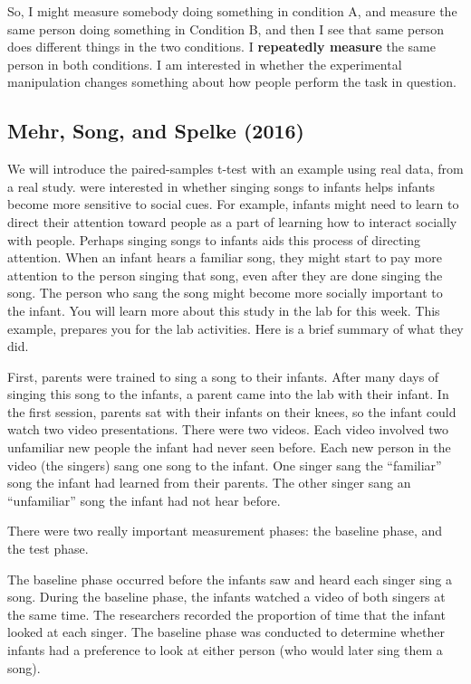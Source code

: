 \documentclass[]{book}
\begin{document}
So, I might measure somebody doing something in condition A, and measure the same person doing something in Condition B, and then I see that same person does different things in the two conditions. I \textbf{repeatedly measure} the same person in both conditions. I am interested in whether the experimental manipulation changes something about how people perform the task in question.

\hypertarget{mehr-song-and-spelke-2016}{%
\subsection{Mehr, Song, and Spelke (2016)}\label{mehr-song-and-spelke-2016}}

We will introduce the paired-samples t-test with an example using real data, from a real study. \citet{mehr20165} were interested in whether singing songs to infants helps infants become more sensitive to social cues. For example, infants might need to learn to direct their attention toward people as a part of learning how to interact socially with people. Perhaps singing songs to infants aids this process of directing attention. When an infant hears a familiar song, they might start to pay more attention to the person singing that song, even after they are done singing the song. The person who sang the song might become more socially important to the infant. You will learn more about this study in the lab for this week. This example, prepares you for the lab activities. Here is a brief summary of what they did.

First, parents were trained to sing a song to their infants. After many days of singing this song to the infants, a parent came into the lab with their infant. In the first session, parents sat with their infants on their knees, so the infant could watch two video presentations. There were two videos. Each video involved two unfamiliar new people the infant had never seen before. Each new person in the video (the singers) sang one song to the infant. One singer sang the ``familiar'' song the infant had learned from their parents. The other singer sang an ``unfamiliar'' song the infant had not hear before.

There were two really important measurement phases: the baseline phase, and the test phase.

The baseline phase occurred before the infants saw and heard each singer sing a song. During the baseline phase, the infants watched a video of both singers at the same time. The researchers recorded the proportion of time that the infant looked at each singer. The baseline phase was conducted to determine whether infants had a preference to look at either person (who would later sing them a song).
\end{document}
